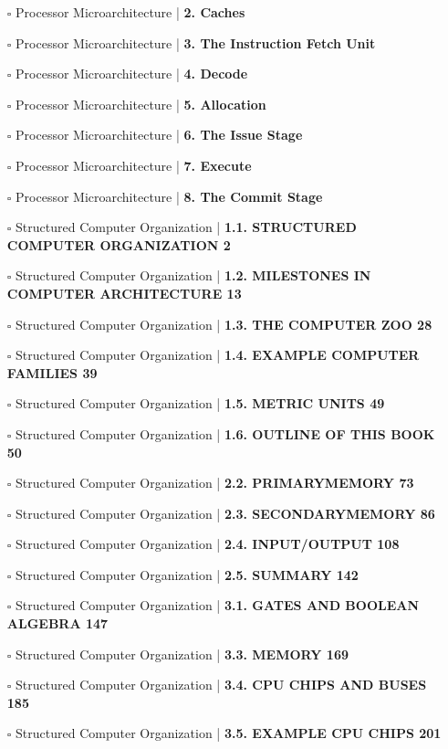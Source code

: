 \documentclass[a4, landscape, 12pt]{article}
\newcommand{\checkbox}{$\square$}%
\begin{document}
\begin{itemize}
{}
\item [\checkbox]  Processor Microarchitecture | \textbf{ 2. Caches
}
\item [\checkbox]  Processor Microarchitecture | \textbf{ 3. The Instruction Fetch Unit
}
\item [\checkbox]  Processor Microarchitecture | \textbf{ 4. Decode
}
\item [\checkbox]  Processor Microarchitecture | \textbf{ 5. Allocation
}
\item [\checkbox]  Processor Microarchitecture | \textbf{ 6. The Issue Stage
}
\item [\checkbox]  Processor Microarchitecture | \textbf{ 7. Execute
}
\item [\checkbox]  Processor Microarchitecture | \textbf{ 8. The Commit Stage
}
\item [\checkbox]  Structured Computer Organization | \textbf{ 1.1. STRUCTURED COMPUTER ORGANIZATION 2
}
\item [\checkbox]  Structured Computer Organization | \textbf{ 1.2. MILESTONES IN COMPUTER ARCHITECTURE 13
}
\item [\checkbox]  Structured Computer Organization | \textbf{ 1.3. THE COMPUTER ZOO 28
}
\item [\checkbox]  Structured Computer Organization | \textbf{ 1.4. EXAMPLE COMPUTER FAMILIES 39
}
\item [\checkbox]  Structured Computer Organization | \textbf{ 1.5. METRIC UNITS 49
}
\item [\checkbox]  Structured Computer Organization | \textbf{ 1.6. OUTLINE OF THIS BOOK 50
}
\item [\checkbox]  Structured Computer Organization | \textbf{ 2.2. PRIMARYMEMORY 73
}
\item [\checkbox]  Structured Computer Organization | \textbf{ 2.3. SECONDARYMEMORY 86
}
\item [\checkbox]  Structured Computer Organization | \textbf{ 2.4. INPUT/OUTPUT 108
}
\item [\checkbox]  Structured Computer Organization | \textbf{ 2.5. SUMMARY 142
}
\item [\checkbox]  Structured Computer Organization | \textbf{ 3.1. GATES AND BOOLEAN ALGEBRA 147
}
\item [\checkbox]  Structured Computer Organization | \textbf{ 3.3. MEMORY 169
}
\item [\checkbox]  Structured Computer Organization | \textbf{ 3.4. CPU CHIPS AND BUSES 185
}
\item [\checkbox]  Structured Computer Organization | \textbf{ 3.5. EXAMPLE CPU CHIPS 201
}
\end{itemize}
\end{document}
